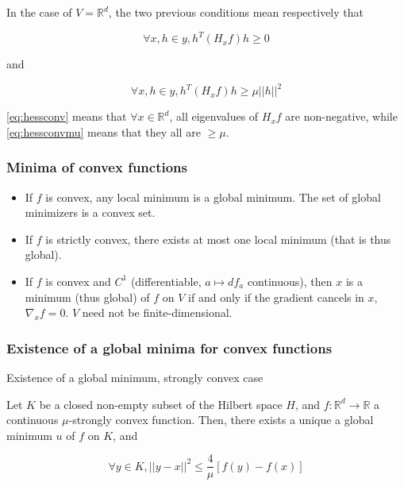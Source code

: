 \documentclass[
10pt, %
a4paper, %
oneside, %
headinclude,footinclude, %
BCOR5mm, %
]{scrartcl}
\begin{document}
\begin{remark}
    In the case of $V= \mathbb{R}^d$, the two previous conditions mean respectively that 

	    \begin{equation}
		\label{eq:hessconv}
		\forall x, h\in y, h^T(H_xf)h\geq 0
	    \end{equation}

	    and

	    \begin{equation}
		\label{eq:hessconvmu}
		\forall x, h\in y, h^T(H_xf)h\geq \mu ||h||^2
	    \end{equation}

	    \ref{eq:hessconv} means that $\forall x\in \mathbb{R}^d$, all eigenvalues of $H_xf$ are non-negative, while \ref{eq:hessconvmu} means that they all are $\geq \mu$.



\end{remark}

\subsubsection{\large\color{Periwinkle}Minima of convex functions}

\begin{proposition}
    \label{prop:miniconv}

    \begin{itemize}
        \item If $f$ is convex, any local minimum is a global minimum. The set of global minimizers is a convex set.
	\item If $f$ is strictly convex, there exists at most one local minimum (that is thus global).
	\item If $f$ is convex and $C^1$ (differentiable, $a\mapsto df_a$ continuous), then $x$ is a minimum (thus global) of $f$ on $V$ if and only if the gradient cancels in $x$, $\nabla_xf=0$. $V$ need not be finite-dimensional.
    \end{itemize}
\end{proposition}

\subsubsection{\large\color{Periwinkle}Existence of a global minima for convex functions}

\begin{theorem}{Existence of a global minimum, strongly convex case}
    \label{th:alphaconv}

    Let $K$ be a closed non-empty subset of the Hilbert space $H$, and $f: \mathbb{R}^d\rightarrow \mathbb{R} $ a continuous $\mu$-strongly convex function. Then, there exists a unique a global minimum $u$ of $f$ on $K$, and

    \begin{equation*}
	\forall y\in K, ||y-x||^2\leq \frac{4}{\mu} [ f(y)-f(x)]
    \end{equation*}
\end{theorem}
\end{document}
